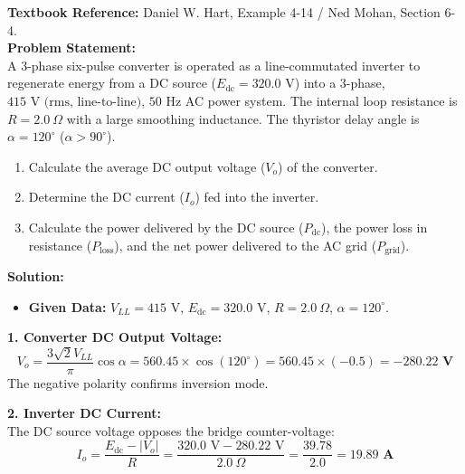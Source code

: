 \documentclass[10pt,a4paper]{article}
\begin{document}
\begin{tcolorbox}[qbox, title={Question 8: Three-Phase Full Converter Operating as a Line-Commutated Inverter}]
\textbf{Textbook Reference:} Daniel W. Hart, Example 4-14 / Ned Mohan, Section 6-4.\\[1mm]
\textbf{Problem Statement:}\\
A 3-phase six-pulse converter is operated as a line-commutated inverter to regenerate energy from a DC source ($E_{\text{dc}} = 320.0\text{ V}$) into a 3-phase, $415\text{ V (rms, line-to-line)}$, $50\text{ Hz}$ AC power system. The internal loop resistance is $R = 2.0\ \Omega$ with a large smoothing inductance. The thyristor delay angle is $\alpha = 120^\circ$ ($\alpha > 90^\circ$).
\begin{enumerate}
  \item Calculate the average DC output voltage ($V_o$) of the converter.
  \item Determine the DC current ($I_o$) fed into the inverter.
  \item Calculate the power delivered by the DC source ($P_{\text{dc}}$), the power loss in resistance ($P_{\text{loss}}$), and the net power delivered to the AC grid ($P_{\text{grid}}$).
\end{enumerate}
\end{tcolorbox}

\vspace{1mm}
\noindent\textbf{\textcolor{accentteal}{Solution:}}
\begin{itemize}
  \item \textbf{Given Data:} $V_{LL} = 415\text{ V}$, $E_{\text{dc}} = 320.0\text{ V}$, $R = 2.0\ \Omega$, $\alpha = 120^\circ$.
\end{itemize}

\noindent\textbf{1. Converter DC Output Voltage:}\\
\[
V_o = \frac{3\sqrt{2} V_{LL}}{\pi} \cos\alpha = 560.45 \times \cos(120^\circ) = 560.45 \times (-0.5) = \mathbf{-280.22\text{ V}}
\]
The negative polarity confirms inversion mode.

\noindent\textbf{2. Inverter DC Current:}\\
The DC source voltage opposes the bridge counter-voltage:
\[
I_o = \frac{E_{\text{dc}} - |V_o|}{R} = \frac{320.0\text{ V} - 280.22\text{ V}}{2.0\ \Omega} = \frac{39.78}{2.0} = \mathbf{19.89\text{ A}}
\]
\end{document}
